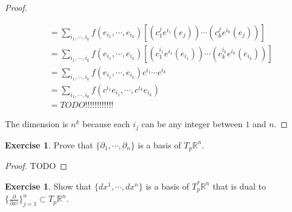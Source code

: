 \documentclass[12pt, psamsfonts]{amsart}
\theoremstyle{definition}
\newtheorem{exer}[thm]{Exercise}
\theoremstyle{remark}
\numberwithin{equation}{section}
\begin{document}
\begin{proof}
\begin{itemize}
\begin{align*}
          &= \sum_{i_1, \cdots, i_k} f(e_{i_1}, \cdots, e_{i_k})[(c^j_1e^{i_1}(e_j)) \cdots (c^j_ke^{i_k}(e_j))] \\
          &= \sum_{i_1, \cdots, i_k} f(e_{i_1}, \cdots, e_{i_k})[(c^{i_1}_1e^{i_1}(e_{i_1})) \cdots (c^{i_k}_ke^{i_k}(e_{i_k}))] \\
          &= \sum_{i_1, \cdots, i_k} f(e_{i_1}, \cdots, e_{i_k})c^{i_1} \cdots c^{i_k} \\
          &= \sum_{i_1, \cdots, i_k} f(c^{i_1}e_{i_1}, \cdots, c^{i_k}e_{i_k}) \\
          &= TODO!!!!!!!!!!!!
      \end{align*}
  \end{itemize}
  The dimension is $n^k$ because each $i_j$ can be any integer between $1$ and $n$.
\end{proof}

\begin{exer}
  Prove that $\{ \partial_1, \cdots, \partial_n \}$ is a basis of $T_p \mathbb{R}^n$.
\end{exer}

\begin{proof}
  TODO
\end{proof}

\begin{exer}
  Show that $\{ dx^1, \cdots, dx^n \}$ is a basis of $T_p^*\mathbb{R}^n$ that is dual to $\{ \frac{\partial}{\partial x^j} \}^n_{j = 1} \subset T_p\mathbb{R}^n$.
\end{exer}
\end{document}
